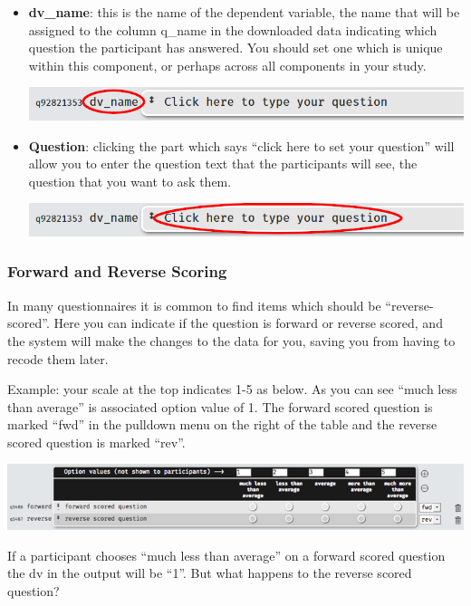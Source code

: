 \documentclass[]{book}
\providecommand{\tightlist}{%
  \setlength{\itemsep}{0pt}\setlength{\parskip}{0pt}}
\begin{document}
\begin{itemize}
\tightlist
\item
  \textbf{dv\_name}: this is the name of the dependent variable, the
  name that will be assigned to the column q\_name in the downloaded
  data indicating which question the participant has answered. You
  should set one which is unique within this component, or perhaps
  across all components in your study.

  \includegraphics{images/screenshots/qname.png}
\item
  \textbf{Question}: clicking the part which says ``click here to set
  your question'' will allow you to enter the question text that the
  participants will see, the question that you want to ask them.

  \includegraphics{images/screenshots/qtext.png}
\end{itemize}

\hypertarget{fwdrev}{\subsubsection*{Forward and Reverse
Scoring}\label{fwdrev}}

In many questionnaires it is common to find items which should be
``reverse-scored''. Here you can indicate if the question is forward or
reverse scored, and the system will make the changes to the data for
you, saving you from having to recode them later.

Example: your scale at the top indicates 1-5 as below. As you can see
``much less than average'' is associated option value of 1. The forward
scored question is marked ``fwd'' in the pulldown menu on the right of
the table and the reverse scored question is marked ``rev''.

\includegraphics{images/screenshots/radio_3.png}

If a participant chooses ``much less than average'' on a forward scored
question the dv in the output will be ``1''. But what happens to the
reverse scored question?
\end{document}
